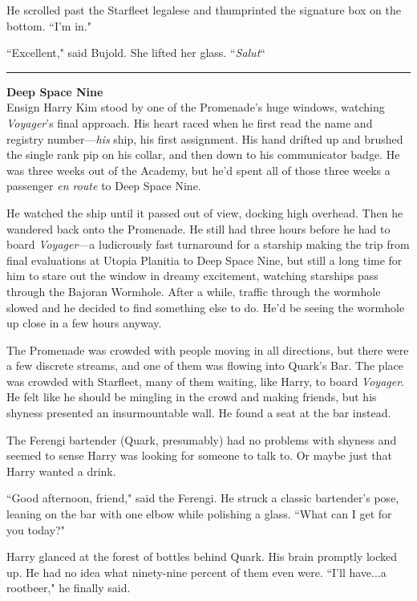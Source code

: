 \documentclass[twoside,letterpaper,12pt]{memoir}
\begin{document}
He scrolled past the Starfleet legalese and thumprinted the signature box on the bottom. ``I'm in."

``Excellent," said Bujold. She lifted her glass. ``\textit{Salut}``

\fancybreak{\rule{3cm}{0.4 pt}}
\noindent\textbf{Deep Space Nine}\\

Ensign Harry Kim stood by one of the Promenade's huge windows, watching \textit{Voyager}'s final approach. His heart raced when he first read the name and registry number---\textit{his} ship, his first assignment. His hand drifted up and brushed the single rank pip on his collar, and then down to his communicator badge. He was three weeks out of the Academy, but he'd spent all of those three weeks a passenger \textit{en route} to Deep Space Nine.

He watched the ship until it passed out of view, docking high overhead. Then he wandered back onto the Promenade. He still had three hours before he had to board \textit{Voyager}---a ludicrously fast turnaround for a starship making the trip from final evaluations at Utopia Planitia to Deep Space Nine, but still a long time for him to stare out the window in dreamy excitement, watching starships pass through the Bajoran Wormhole. After a while, traffic through the wormhole slowed and he decided to find something else to do. He'd be seeing the wormhole up close in a few hours anyway.

The Promenade was crowded with people moving in all directions, but there were a few discrete streams, and one of them was flowing into Quark's Bar. The place was crowded with Starfleet, many of them waiting, like Harry, to board \textit{Voyager}. He felt like he should be mingling in the crowd and making friends, but his shyness presented an insurmountable wall. He found a seat at the bar instead.

The Ferengi bartender (Quark, presumably) had no problems with shyness and seemed to sense Harry was looking for someone to talk to. Or maybe just that Harry wanted a drink.

``Good afternoon, friend," said the Ferengi. He struck a classic bartender's pose, leaning on the bar with one elbow while polishing a glass. ``What can I get for you today?"

Harry glanced at the forest of bottles behind Quark. His brain promptly locked up. He had no idea what ninety-nine percent of them even were. ``I'll have...a rootbeer," he finally said.
\end{document}
